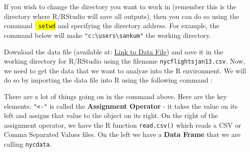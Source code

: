 \documentclass[10pt, letterpaper, twoside]{memoir}\usepackage{knitr}
\newcommand\rcommand[1]{
\colorbox{yellow}{\texttt{\color{red} #1}}
\index{R Commands!#1}
}
\begin{document}
If you wish to change the directory you want to work in (remember this is the directory where R/RStudio will save all outputs), then you can do so using the command \rcommand{setwd} and specifying the directory address. For example, the command below will make \verb|"c:\users\sankum"| the working directory. 

\begin{knitrout}
\color{fgcolor}\begin{kframe}
\begin{alltt}
\end{alltt}
\end{kframe}
\end{knitrout}

Download the data file (available at: \href{https://umich.box.com/s/xtpp98qygojc0fh14vhlvdr6nzsa47a2}{Link to Data File}) and save it in the working directory for R/RStudio using the filename \texttt{nycflightsjan13.csv}. Now, we need to get the data that we want to analyze into the R environment. We will do so by importing the data file into R using the following command :

\begin{knitrout}
\color{fgcolor}\begin{kframe}
\begin{alltt}
 \hlkwb{<-} \hlstd{(}\hlstd{)}
\end{alltt}
\end{kframe}
\end{knitrout}

There are a lot of things going on in the command above. Here are the key elements: \texttt{"<-"} is called the \textbf{Assignment Operator} - it takes the value on its left and assigns that value to the object on its right. On the right of the assignment operator, we have the R function \texttt{read.csv()} which reads a CSV or Comma Separated Values files. On the left we have a \textbf{Data Frame} that we are calling \texttt{nycdata}. 
\end{document}
